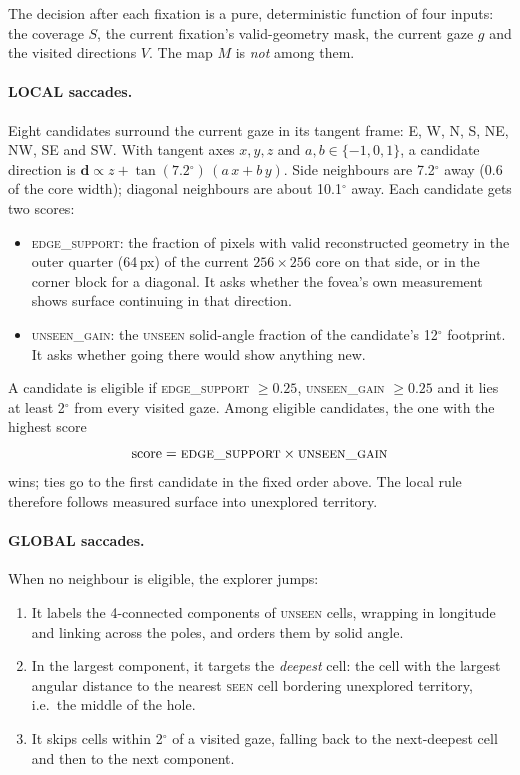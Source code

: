 \documentclass[11pt,a4paper]{article}
\newcommand{\degr}{\ensuremath{^\circ}}
\begin{document}
The decision after each fixation is a pure, deterministic function of four inputs: the coverage $S$, the current
fixation's valid-geometry mask, the current gaze $g$ and the visited directions $V$. The map $M$ is \emph{not} among
them.

\paragraph{LOCAL saccades.} Eight candidates surround the current gaze in its tangent frame: E, W, N, S, NE, NW, SE and
SW. With tangent axes $x, y, z$ and $a, b \in \{-1, 0, 1\}$, a candidate direction is
$\mathbf{d} \propto z + \tan(7.2\degr)\,(a\,x + b\,y)$. Side neighbours are 7.2\degr{} away (0.6 of the core width);
diagonal neighbours are about 10.1\degr{} away. Each candidate gets two scores:
\begin{itemize}
  \item \textsc{edge\_support}: the fraction of pixels with valid reconstructed geometry in the outer quarter (64\,px)
        of the current $256\times256$ core on that side, or in the corner block for a diagonal. It asks whether the
        fovea's own measurement shows surface continuing in that direction.
  \item \textsc{unseen\_gain}: the \textsc{unseen} solid-angle fraction of the candidate's 12\degr{} footprint. It asks
        whether going there would show anything new.
\end{itemize}
A candidate is eligible if \textsc{edge\_support} $\ge 0.25$, \textsc{unseen\_gain} $\ge 0.25$ and it lies at least
2\degr{} from every visited gaze. Among eligible candidates, the one with the highest score
\begin{equation}
  \text{score} = \textsc{edge\_support} \times \textsc{unseen\_gain}
  \label{eq:score}
\end{equation}
wins; ties go to the first candidate in the fixed order above. The local rule therefore follows measured surface into
unexplored territory.

\paragraph{GLOBAL saccades.} When no neighbour is eligible, the explorer jumps:
\begin{enumerate}
  \item It labels the 4-connected components of \textsc{unseen} cells, wrapping in longitude and linking across the
        poles, and orders them by solid angle.
  \item In the largest component, it targets the \emph{deepest} cell: the cell with the largest angular distance to
        the nearest \textsc{seen} cell bordering unexplored territory, i.e.\ the middle of the hole.
  \item It skips cells within 2\degr{} of a visited gaze, falling back to the next-deepest cell and then to the next
        component.
\end{enumerate}
\end{document}
